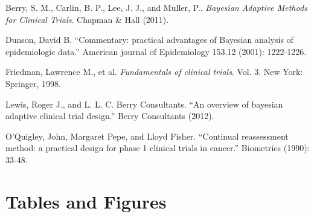 \documentclass[12pt]{article}
\begin{document}
\newpage

\begin{thebibliography}{}

 Berry, S. M., Carlin, B. P., Lee, J. J., and Muller, P.. {\it Bayesian Adaptive Methods for Clinical Trials}. Chapman \& Hall (2011).

 Dunson, David B. ``Commentary: practical advantages of Bayesian analysis of epidemiologic data.'' American journal of Epidemiology 153.12 (2001): 1222-1226.

 Friedman, Lawrence M., et al. {\it Fundamentals of clinical trials}. Vol. 3. New York: Springer, 1998.

 Lewis, Roger J., and L. L. C. Berry Consultants. ``An overview of bayesian adaptive clinical trial design.'' Berry Consultants (2012).

 O'Quigley, John, Margaret Pepe, and Lloyd Fisher. ``Continual reassessment method: a practical design for phase 1 clinical trials in cancer.'' Biometrics (1990): 33-48.

\end{thebibliography}

\newpage

\appendix

\section{Tables and Figures}
\end{document}
